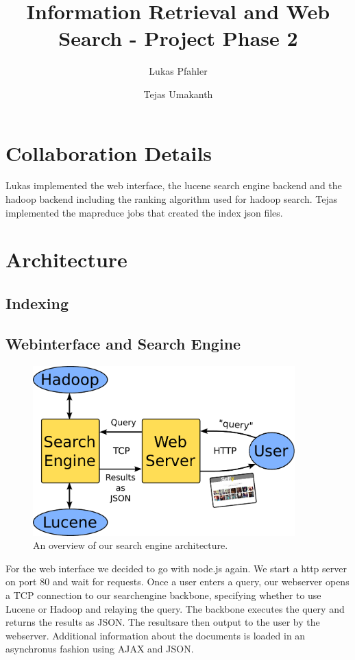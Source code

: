 \documentclass[11pt]{article}
\title{Information Retrieval and Web Search - Project Phase 2}
\author{Lukas Pfahler \and Tejas Umakanth}
\begin{document}
\maketitle
\section{Collaboration Details}	
	Lukas implemented the web interface, the lucene search engine backend and the hadoop backend including the ranking algorithm used for hadoop search. Tejas implemented the mapreduce jobs that created the index json files.
\section{Architecture}
	\subsection{Indexing}
	\subsection{Webinterface and Search Engine}
		\begin{figure}[h]
			\begin{center}
				\includegraphics[width=0.9\textwidth,keepaspectratio]{architecture.pdf}
			\end{center}
			\caption{An overview of our search engine architecture.}
			\label{fig1}
		\end{figure}
		For the web interface we decided to go with node.js again. We start a http server on port 80 and wait for requests. Once a user enters a query, our webserver opens a TCP connection to our searchengine backbone, specifying whether to use Lucene or Hadoop and relaying the query. The backbone executes the query and returns the results as JSON. The resultsare then  output to the user by the webserver. Additional information about the documents is loaded in an asynchronus fashion using AJAX and JSON.
\end{document}
